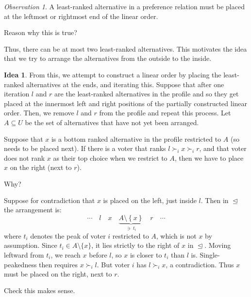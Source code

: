 \documentclass{book}
\newcommand{\unclear}[1]{%
  \par\noindent
  \colorbox{yellow!30}{#1}\par
}
\theoremstyle{plain}
\theoremstyle{definition}
\newtheorem{idea}[theorem]{Idea}
\theoremstyle{remark}
\newtheorem{observation}[theorem]{Observation}
\newcommand{\set}[1]{\left\{#1\right\}}
\begin{document}
\begin{observation}
    A least-ranked alternative in a preference relation
    must be placed at the leftmost or rightmost end of the linear order.
    \unclear{Reason why this is true?}
    Thus, there can be at most two least-ranked alternatives.
    This motivates the idea that we try to arrange the alternatives from the outside to the inside.
\end{observation}

\begin{idea}
    From this, we attempt to construct a linear order 
    by placing the least-ranked alternatives at the ends, 
    and iterating this.
    Suppose that after one iteration 
    $l$ and $r$ are the least-ranked alternatives in the profile and 
    so they get placed at the innermost left and right positions of 
    the partially constructed linear order.
    Then, we remove $l$ and $r$ from the profile and repeat this process.
    Let $A \subseteq U$ be the set of alternatives that have not yet been arranged.

    Suppose that $x$ is a bottom ranked alternative in
    the profile restricted to $A$ (so needs to be placed next).
    If there is a voter that ranks
    $l \succ_i x \succ_i r$, and 
    that voter does not rank $x$ as their top choice when 
    we restrict to $A$, then we have to place 
    $x$ on the right (next to $r$).

    Why?

    
    Suppose for contradiction that $x$ is placed on the left, 
    just inside $l$. Then in $\trianglelefteq$ the arrangement is:
    \[
        \cdots \quad l \quad x \quad \underbrace{A \setminus \set{x}}_{\ni\; t_i} \quad r \quad \cdots
    \]
    where $t_i$ denotes the peak of voter $i$ restricted to $A$,
    which is not $x$ by assumption.
    Since $t_i \in A \setminus \{x\}$, 
    it lies strictly to the right of $x$ in $\trianglelefteq$.
    Moving leftward from $t_i$, 
    we reach $x$ before $l$, 
    so $x$ is closer to $t_i$ than $l$ is.
    Single-peakedness then requires $x \succ_i l$.
    But voter $i$ has $l \succ_i x$, a contradiction.
    Thus $x$ must be placed on the right, next to $r$.
    \unclear{Check this makes sense.}
\end{idea}
\end{document}
